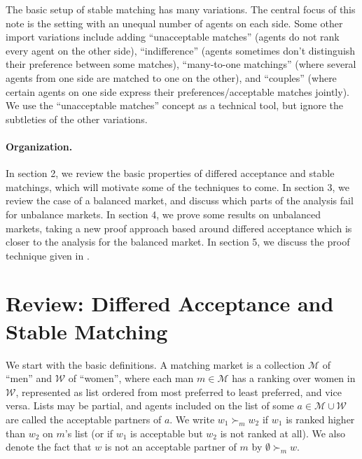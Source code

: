 \documentclass[12pt]{article}
\newcommand{\M}{\mathcal{M}}
\newcommand{\W}{\mathcal{W}}
\begin{document}
  The basic setup of stable matching has many variations.
  The central focus of this note is the setting with an unequal number of agents
  on each side.
  Some other import variations include adding ``unacceptable matches'' (agents do not
  rank every agent on the other side), ``indifference'' (agents sometimes don't
  distinguish their preference between some matches), ``many-to-one matchings''
  (where several agents from one side are matched to one on the other),
  and ``couples'' (where certain agents on one side express their 
  preferences/acceptable matches jointly).
  We use the ``unacceptable matches'' concept as a technical tool,
  but ignore the subtleties of the other variations.

  \paragraph{Organization.}
  In section 2, we review the basic properties of differed acceptance and stable
  matchings, which will motivate some of the techniques to come.
  In section 3, we review the case of a balanced market, and discuss which parts
  of the analysis fail for unbalance markets.
  In section 4, we prove some results on unbalanced markets, taking a new proof
  approach based around differed acceptance which is closer to the analysis for
  the balanced market.
  In section 5, we discuss the proof technique given in
  \cite{AshlagiUnbalancedCompetition17}.

\section{Review: Differed Acceptance and Stable Matching}


  We start with the basic definitions.
  A matching market is a collection $\M$ of ``men'' and $\W$ of ``women'', where
  each man $m\in \M$ has a ranking over women in $\W$, represented
  as list ordered from most preferred to least preferred, and vice versa.
  Lists may be partial, and agents included on the list of some $a \in \M\cup\W$
  are called the acceptable partners of $a$.
  We write $w_1 \succ_m w_2$ if $w_1$ is ranked higher than $w_2$ on $m$'s list
  (or if $w_1$ is acceptable but $w_2$ is not ranked at all).
  We also denote the fact that $w$ is not an acceptable partner of $m$ by
  $\emptyset \succ_m w$.
\end{document}
